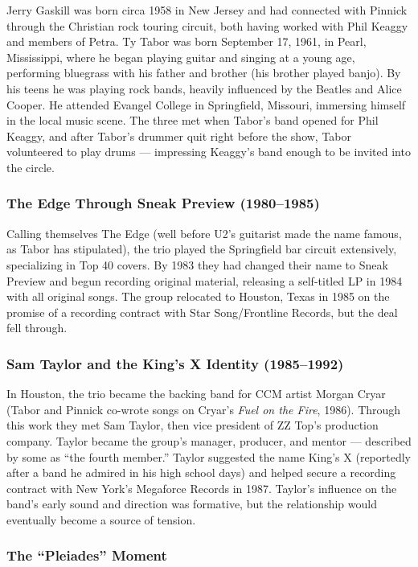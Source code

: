 \documentclass[11pt,letterpaper]{article}
\begin{document}
Jerry Gaskill was born circa 1958 in New Jersey and had connected with Pinnick through the Christian rock touring circuit, both having worked with Phil Keaggy and members of Petra. Ty Tabor was born September 17, 1961, in Pearl, Mississippi, where he began playing guitar and singing at a young age, performing bluegrass with his father and brother (his brother played banjo). By his teens he was playing rock bands, heavily influenced by the Beatles and Alice Cooper. He attended Evangel College in Springfield, Missouri, immersing himself in the local music scene. The three met when Tabor's band opened for Phil Keaggy, and after Tabor's drummer quit right before the show, Tabor volunteered to play drums --- impressing Keaggy's band enough to be invited into the circle.

\subsubsection{The Edge Through Sneak Preview (1980--1985)}

Calling themselves The Edge (well before U2's guitarist made the name famous, as Tabor has stipulated), the trio played the Springfield bar circuit extensively, specializing in Top 40 covers. By 1983 they had changed their name to Sneak Preview and begun recording original material, releasing a self-titled LP in 1984 with all original songs. The group relocated to Houston, Texas in 1985 on the promise of a recording contract with Star Song/Frontline Records, but the deal fell through.

\subsubsection{Sam Taylor and the King's X Identity (1985--1992)}

In Houston, the trio became the backing band for CCM artist Morgan Cryar (Tabor and Pinnick co-wrote songs on Cryar's \textit{Fuel on the Fire}, 1986). Through this work they met Sam Taylor, then vice president of ZZ Top's production company. Taylor became the group's manager, producer, and mentor --- described by some as ``the fourth member.'' Taylor suggested the name King's X (reportedly after a band he admired in his high school days) and helped secure a recording contract with New York's Megaforce Records in 1987. Taylor's influence on the band's early sound and direction was formative, but the relationship would eventually become a source of tension.

\subsubsection{The ``Pleiades'' Moment}
\end{document}

